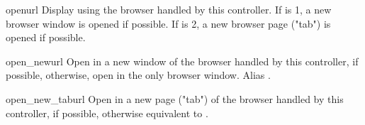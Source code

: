 \begin{funcdesc}{open}{url}
  Display  using the browser handled by this controller.
  If  is 1, a new browser window is opened if possible.
  If  is 2, a new browser page ("tab") is opened if possible.
\end{funcdesc}

\begin{funcdesc}{open_new}{url}
  Open  in a new window of the browser handled by this
  controller, if possible, otherwise, open  in the only
  browser window.  Alias .
\end{funcdesc}

\begin{funcdesc}{open_new_tab}{url}
  Open  in a new page ("tab") of the browser handled by this
  controller, if possible, otherwise equivalent to .
\end{funcdesc}
